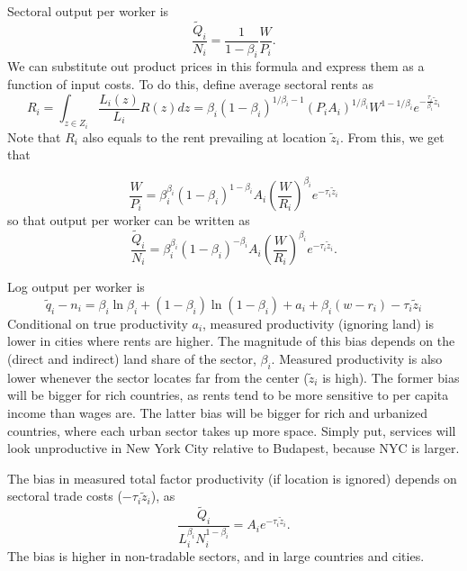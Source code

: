 \documentclass[12pt]{article}
\begin{document}
Sectoral output per worker is
\[
\frac{\tilde Q_i}{N_i} = \frac1{1-\beta_i}
\frac{W}{P_i}.
\]
We can substitute out product prices in this formula and express them as a function of input costs. To do this, define average sectoral rents as
\begin{equation}
R_i =\int_{z\in Z_i}\frac{L_i(z)}{L_i}R(z)dz = \beta_i(1-\beta_i)^{1/\beta_i-1} \left(P_iA_i\right)^{1/\beta_i} W^{1-1/\beta_i} e^{-\frac{\tau_i}{\beta_i} \tilde{z}_i}
\end{equation}
Note that $R_i$ also equals to the rent prevailing at location $\tilde z_i$. From this, we get that 

\[
\frac{W}{P_i}  =\beta_i^{\beta_i}(1-\beta_i)^{1-\beta_i}
A_i
\left(\frac{W}{R_i}\right)^{\beta_i}
 e^{-\tau_i \tilde z_i}
\]
so that output per worker can be written as
\begin{equation}
\frac{\tilde Q_i}{N_i} = \beta_i^{\beta_i}(1-\beta_i)^{-\beta_i}
A_i
\left(\frac{W}{R_i}\right)^{\beta_i}e^{-\tau_i \tilde z_i}.
\end{equation}

Log output per worker is
\[
\tilde q_i - n_i =
\beta_i\ln\beta_i+(1-\beta_i)\ln(1-\beta_i)
+a_i +\beta_i (w
-r_i)
- \tau_{i}\tilde z_{i}
\]
Conditional on true productivity $a_i$, measured productivity (ignoring land) is lower in cities where rents are higher. The magnitude of this bias depends on the (direct and indirect) land share of the sector, $\beta_i$. Measured productivity is also lower whenever the sector locates far from the center ($\tilde z_i$ is high). %
The former bias will be bigger for rich countries, as rents tend to be more sensitive to per capita income than wages are. The latter bias will be bigger for rich and urbanized countries, where each urban sector takes up more space. Simply put, services will look unproductive in New York City relative to Budapest, because NYC is larger.

The bias in measured total factor productivity (if location is ignored) depends on sectoral trade costs ($-\tau_i\tilde z_i$), as 
\begin{equation}
\frac{\tilde Q_i}{L_i^{\beta_i}N_i^{1-\beta_i}} = A_i e^{-\tau_i \tilde z_i}.
\end{equation}
The bias is higher in non-tradable sectors, and in large countries and cities. 
\end{document}
